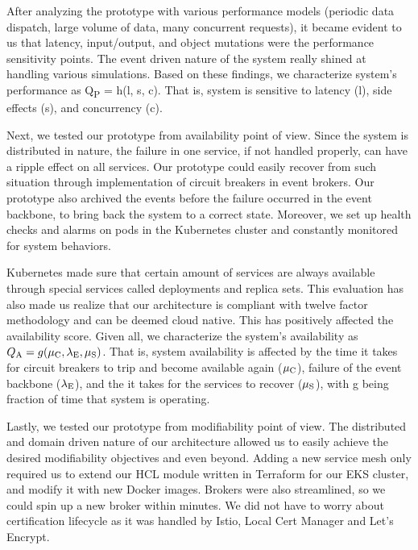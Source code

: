 \documentclass[runningheads]{llncs}
\begin{document}

After analyzing the prototype with various performance models (periodic data dispatch, large volume of data, many concurrent requests), it became evident to us that latency, input/output, and object mutations were the performance sensitivity points. The event driven nature of the system really shined at handling various simulations. Based on these findings, we characterize system's performance as  Q\textsubscript{P} = h(l, s, c). That is, system is sensitive to latency (l), side effects (s), and concurrency (c).

Next, we tested our prototype from availability point of view. Since the system is distributed in nature, the failure in one service, if not handled properly, can have a ripple effect on all services. Our prototype could easily recover from such situation through implementation of circuit breakers in event brokers. Our prototype also archived the events before the failure occurred in the event backbone, to bring back the system to a correct state. Moreover, we set up health checks and alarms on pods in the Kubernetes cluster and constantly monitored for system behaviors. 



Kubernetes made sure that certain amount of services are always available through special services called deployments and replica sets. This evaluation has also made us realize that our architecture is compliant with twelve factor methodology and can be deemed cloud native. This has positively affected the availability score. Given all, we characterize the system's availability as $Q\textsubscript{A} = g(\mu\textsubscript{C}, \lambda\textsubscript{E}, \mu\textsubscript{S})$. That is, system availability is affected by the time it takes for circuit breakers to trip and become available again ($\mu\textsubscript{C}$), failure of the event backbone ($\lambda\textsubscript{E}$), and the it takes for the services to recover ($\mu\textsubscript{S}$), with g being fraction of time that system is operating.

Lastly, we tested our prototype from modifiability point of view. The distributed and domain driven nature of our architecture allowed us to easily achieve the desired modifiability objectives and even beyond. Adding a new service mesh only required us to extend our HCL module written in Terraform for our EKS cluster, and modify it with new Docker images. Brokers were also streamlined, so we could spin up a new broker within minutes. We did not have to worry about certification lifecycle as it was handled by Istio, Local Cert Manager and Let's Encrypt. 
\end{document}
